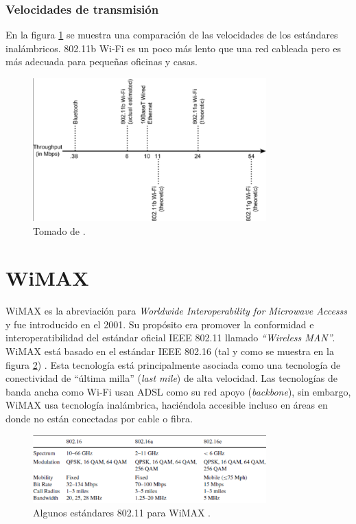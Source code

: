 \documentclass[10pt,journal,compsoc]{IEEEtran}
\begin{document}
\subsubsection{Velocidades de transmisión}
En la figura \ref{fig:wifi-velocidades} se muestra una comparación de las velocidades de los estándares inalámbricos. 802.11b Wi-Fi es un poco más lento que una red cableada pero es más adecuada para pequeñas oficinas y casas.

\begin{figure}[h]
    \centering
    \includegraphics[width=9cm]{wifi-velocidades}
    \caption{Tomado de \cite{davis}.}
    \label{fig:wifi-velocidades}
\end{figure}

\section{WiMAX}
WiMAX es la abreviación para \emph{Worldwide Interoperability for Microwave Accesss} y fue introducido en el 2001. Su propósito era promover la conformidad e interoperatibilidad del estándar oficial IEEE 802.11 llamado \emph{``Wireless MAN''}. WiMAX está basado en el estándar IEEE 802.16 (tal y como se muestra en la figura \ref{fig:wimax-standards}) . Esta tecnología está principalmente asociada como una tecnología de conectividad de ``última milla'' (\emph{last mile})  de alta velocidad. Las tecnologías de banda ancha como Wi-Fi usan ADSL como su red apoyo (\emph{backbone}), sin embargo, WiMAX usa tecnología inalámbrica, haciéndola accesible incluso en áreas en donde no están conectadas por cable o fibra.

\begin{figure}[h]
    \centering
    \includegraphics[width=9cm]{wimax-standards}
    \caption{Algunos estándares 802.11 para WiMAX \cite{mishra}.}
    \label{fig:wimax-standards}
\end{figure}
\end{document}
